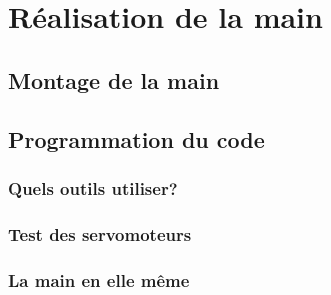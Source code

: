\newpage

\section{Réalisation de la main}


\subsection{Montage de la main}



\newpage

\subsection{Programmation du code}

\subsubsection{Quels outils utiliser?}





\subsubsection{Test des servomoteurs}



\newpage
\subsubsection{La main en elle même}


